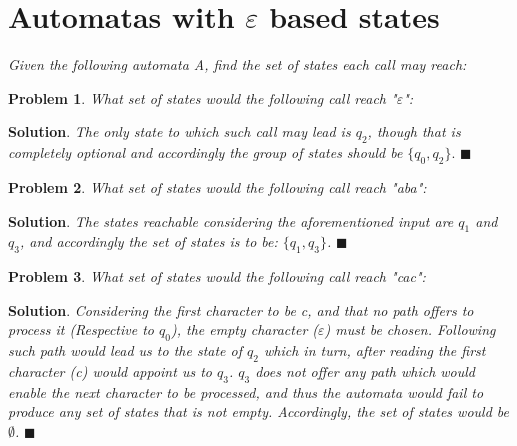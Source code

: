 \documentclass[12pt]{article}
\renewcommand{\=}[1]{\stackrel{#1}{=}} %
\newtheorem{p}{Problem}[section]
\theoremstyle{definition}
\newenvironment{s}{%
        \begin{trivlist} \item \textbf{Solution}. }{%
            \hspace*{\fill} $\blacksquare$\end{trivlist}}%
\begin{document}
\section{Automatas with $\varepsilon$ based states}
\emph{\newline Given the following automata A, find the set of states each call may reach:} \newline
  \\
\begin{p}
\emph{What set of states would the following call reach "$\varepsilon$":} \newline
\end{p}
\begin{s} \newline
  \emph{The only state to which such call may lead is $q_2$, though that is completely optional and accordingly the group of states should be $\{q_0, q_2\}.$}
\end{s}
\begin{p}
\emph{What set of states would the following call reach "aba":} \newline
\end{p}
\begin{s} \newline
  \emph{The states reachable considering the aforementioned input are $q_1$ and $q_3$, and accordingly the set of states is to be: $\{q_1, q_3\}$.}
\end{s}
\begin{p}
\emph{What set of states would the following call reach "cac":} \newline
\end{p}
\begin{s} \newline
  \emph{Considering the first character to be c, and that no path offers to process it (Respective to $q_0$), the empty character ($\varepsilon$) must be chosen. Following such path would lead us to the state of $q_2$ which in turn, after reading the first character (c) would appoint us to $q_3$. $q_3$ does not offer any path which would enable the next character to be processed, and thus the automata would fail to produce any set of states that is not empty. Accordingly, the set of states would be $\emptyset$.}
\end{s}
\end{document}
